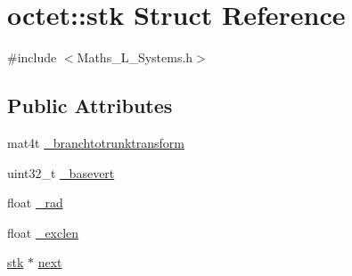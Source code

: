 \hypertarget{structoctet_1_1stk}{\section{octet\+:\+:stk Struct Reference}
\label{structoctet_1_1stk}
}


{\ttfamily \#include $<$Maths\+\_\+\+L\+\_\+\+Systems.\+h$>$}

\subsection*{Public Attributes}
\begin{DoxyCompactItemize}
\item 
mat4t \hyperlink{structoctet_1_1stk_a8374d3134d4d73045c31f022a21c2748}{\+\_\+branchtotrunktransform}
\item 
uint32\+\_\+t \hyperlink{structoctet_1_1stk_ae0a1b4ff1ffcce545dbdef793ab339da}{\+\_\+basevert}
\item 
float \hyperlink{structoctet_1_1stk_aa84c6095af9c2ce6537bde5890fd5231}{\+\_\+rad}
\item 
float \hyperlink{structoctet_1_1stk_a10f3a3433d85dda46feebf0bca229e02}{\+\_\+exclen}
\item 
\hyperlink{structoctet_1_1stk}{stk} $\ast$ \hyperlink{structoctet_1_1stk_aa2ba0a1b75f1f0725a21d7cfab94db76}{next}
\end{DoxyCompactItemize}


